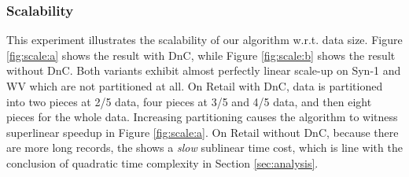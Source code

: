 
\subsubsection{Scalability}\label{sec:eval:scale}
This experiment illustrates the scalability of our algorithm
w.r.t. data size. Figure \ref{fig:scale:a} shows the result with
DnC, while Figure \ref{fig:scale:b} shows the result
without DnC. Both variants exhibit almost perfectly
linear scale-up on Syn-1 and WV which are not partitioned at all.
On Retail with DnC, data is partitioned into
two pieces at 2/5 data, four pieces at 3/5 and 4/5 data, and then
eight pieces for the whole data. Increasing partitioning causes the algorithm
to witness superlinear speedup in Figure \ref{fig:scale:a}.
On Retail without DnC, because there are more long records,
the \PartialR shows a {\em slow} sublinear time cost, which is
line with the conclusion of quadratic time complexity 
in Section \ref{sec:analysis}.


